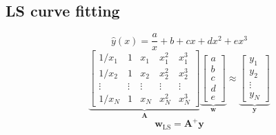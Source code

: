 \documentclass[english]{latex4ei/latex4ei_sheet}
\begin{document}
\begin{sectionbox}
  \subsection{LS curve fitting}
  $$\hat{y}(x)=\frac{a}{x}+b+c x+d x^{2}+e x^{3}$$
  $$\underbrace{\left[\begin{array}{ccccc}
    1 / x_{1} & 1 & x_{1} & x_{1}^{2} & x_{1}^{3} \\
    1 / x_{2} & 1 & x_{2} & x_{2}^{2} & x_{2}^{3} \\
    \vdots & \vdots & \vdots & \vdots & \vdots \\
    1 / x_{N} & 1 & x_{N} & x_{N}^{2} & x_{N}^{3}
    \end{array}\right]}_{\boldsymbol{A}} \underbrace{\left[\begin{array}{c}
    a \\
    b \\
    c \\
    d \\
    e
    \end{array}\right]}_{\boldsymbol{w}} \approx \underbrace{\left[\begin{array}{c}
    y_{1} \\
    y_{2} \\
    \vdots \\
    y_{N}
    \end{array}\right]}_{\boldsymbol{y}}$$
    $$\boldsymbol{w}_{\mathrm{LS}}=\boldsymbol{A}^{+} \boldsymbol{y}$$
\end{sectionbox}
\end{document}
